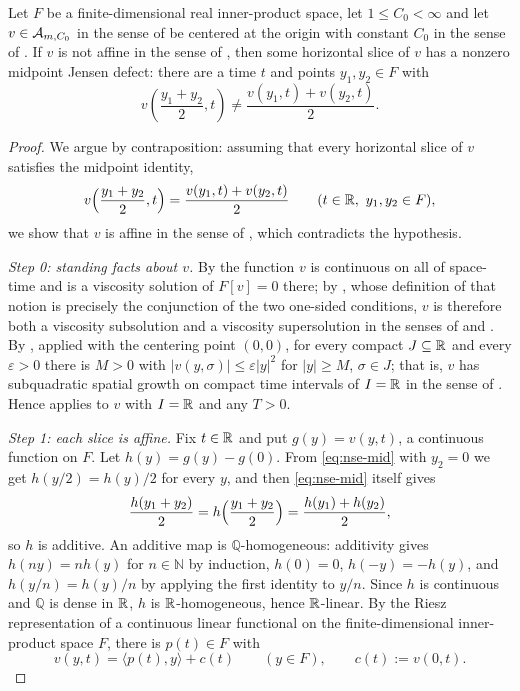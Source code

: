 \begin{lemma}
Let $F$ be a finite-dimensional real inner-product space, let $1\le C_0<\infty$
and let $v\in\mathcal{A}_{m,C_0}$ in the sense of  be centered at
the origin with constant $C_0$ in the sense of . If $v$ is
not affine in the sense of , then some horizontal
slice of $v$ has a nonzero midpoint Jensen defect: there are a time $t$ and
points $y_1,y_2\in F$ with
\[
  v\left(\frac{y_1+y_2}{2},t\right)
    \ne\frac{v(y_1,t)+v(y_2,t)}{2}.
\]
\end{lemma}
\begin{proof}
We argue by contraposition: assuming that every horizontal slice of $v$
satisfies the midpoint identity,
\begin{equation}\label{eq:nse-mid}
  v\Bigl(\frac{y_1+y_2}{2},t\Bigr)=\frac{v(y_1,t)+v(y_2,t)}{2}
  \qquad(t\in\mathbb{R},\ y_1,y_2\in F),
\end{equation}
we show that $v$ is affine in the sense of , which
contradicts the hypothesis.

\emph{Step 0: standing facts about $v$.}
By  the function $v$ is continuous on all of space-time and
is a viscosity solution of $F[v]=0$ there; by , whose
definition of that notion is precisely the conjunction of the two one-sided
conditions, $v$ is therefore both a viscosity subsolution and a viscosity
supersolution in the senses of  and
. By
, applied with the centering point $(0,0)$, for
every compact $J\subseteq\mathbb{R}$ and every $\varepsilon>0$ there is $M>0$ with
$|v(y,\sigma)|\le\varepsilon|y|^2$ for $|y|\ge M$, $\sigma\in J$; that is, $v$
has subquadratic spatial growth on compact time intervals of $I=\mathbb{R}$ in the sense
of . Hence  applies to
$v$ with $I=\mathbb{R}$ and any $T>0$.

\emph{Step 1: each slice is affine.}
Fix $t\in\mathbb{R}$ and put $g(y)=v(y,t)$, a continuous function on $F$. Let
$h(y)=g(y)-g(0)$. From \eqref{eq:nse-mid} with $y_2=0$ we get
$h(y/2)=h(y)/2$ for every $y$, and then \eqref{eq:nse-mid} itself gives
\[
  \frac{h(y_1+y_2)}{2}=h\Bigl(\frac{y_1+y_2}{2}\Bigr)
   =\frac{h(y_1)+h(y_2)}{2},
\]
so $h$ is additive. An additive map is $\mathbb Q$-homogeneous: additivity gives
$h(ny)=nh(y)$ for $n\in\mathbb N$ by induction, $h(0)=0$, $h(-y)=-h(y)$, and
$h(y/n)=h(y)/n$ by applying the first identity to $y/n$. Since $h$ is
continuous and $\mathbb Q$ is dense in $\mathbb{R}$, $h$ is $\mathbb{R}$-homogeneous, hence
$\mathbb{R}$-linear. By the Riesz representation of a continuous linear functional on
the finite-dimensional inner-product space $F$, there is $p(t)\in F$ with
\begin{equation}\label{eq:nse-slice}
  v(y,t)=\langle p(t),y\rangle+c(t)\qquad(y\in F),\qquad c(t):=v(0,t).
\end{equation}


\end{proof}

